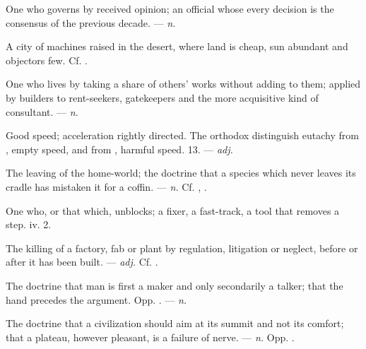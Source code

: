  One who governs by received opinion; an official whose every decision is the consensus of the previous decade. ---  \textit{n.}

 A city of machines raised in the desert, where land is cheap, sun abundant and objectors few.   Cf. .

  One who lives by taking a share of others' works without adding to them; applied by builders to rent-seekers, gatekeepers and the more acquisitive kind of consultant. ---  \textit{n.}

 Good speed; acceleration rightly directed. The orthodox distinguish eutachy from , empty speed, and from , harmful speed.   13. ---  \textit{adj.}

 The leaving of the home-world; the doctrine that a species which never leaves its cradle has mistaken it for a coffin. ---  \textit{n.} Cf. , .

 One who, or that which, unblocks; a fixer, a fast-track, a tool that removes a step.   iv. 2.

 The killing of a factory, fab or plant by regulation, litigation or neglect, before or after it has been built. ---  \textit{adj.} Cf. .

 The doctrine that man is first a maker and only secondarily a talker; that the hand precedes the argument. Opp. . ---  \textit{n.}

 The doctrine that a civilization should aim at its summit and not its comfort; that a plateau, however pleasant, is a failure of nerve. ---  \textit{n.} Opp. .

